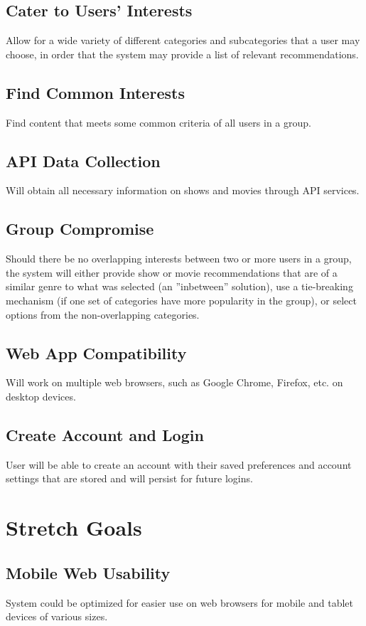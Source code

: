 \documentclass{article}
\begin{document}
\subsection{Cater to Users' Interests}
Allow for a wide variety of different categories and subcategories that a user may choose, in order that the system may provide a list of relevant recommendations.

\subsection{Find Common Interests}
Find content that meets some common criteria of all users in a group.

\subsection{API Data Collection}
Will obtain all necessary information on shows and movies through API services.

\subsection{Group Compromise}
Should there be no overlapping interests between two or more users in a group, the system will either provide show or movie recommendations that are of a similar 
genre to what was selected (an ”inbetween” solution), use a tie-breaking mechanism (if one set of categories have more popularity in the group), or select options 
from the non-overlapping categories.

\subsection{Web App Compatibility}
Will work on multiple web browsers, such as Google Chrome, Firefox, etc. on desktop devices.

\subsection{Create Account and Login}
User will be able to create an account with their saved preferences and account settings that are stored and will persist for future logins.

\section{Stretch Goals}

\subsection{Mobile Web Usability}
System could be optimized for easier use on web browsers for mobile and tablet devices of various sizes.
\end{document}
